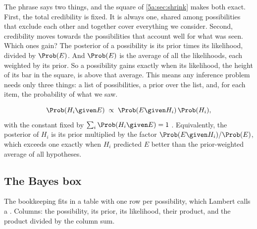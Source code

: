 The phrase says two things, and the square of \cref{5a:sec:shrink} makes both
exact. First, the total credibility is fixed. It is always one, shared among
possibilities that exclude each other and together cover everything we consider.
Second, credibility moves towards the possibilities that account well for what
was seen. Which ones gain? The posterior of a possibility is its prior times its
likelihood, divided by $\Prob(E)$. And $\Prob(E)$ is the average of all the
likelihoods, each weighted by its prior. So a possibility gains exactly when its
likelihood, the height of its bar in the square, is above that average. This
means any inference problem needs only three things: a list of possibilities, a
prior over the list, and, for each item, the probability of what we saw.

\begin{keyidea}
\[
  \Prob(H_i\given E)\;\propto\;\Prob(E\given H_i)\,\Prob(H_i),
\]
with the constant fixed by $\sum_i\Prob(H_i\given E)=1$ . Equivalently, the posterior of $H_i$ is its prior
multiplied by the factor $\Prob(E\given H_i)/\Prob(E)$, which exceeds one exactly when
$H_i$ predicted $E$ better than the prior-weighted average of all hypotheses.
\end{keyidea}

\subsection{The Bayes box}

The bookkeeping fits in a table with one row per possibility, which Lambert calls a
 . Columns: the possibility, its prior,
its likelihood, their product, and the product divided by the column sum.

